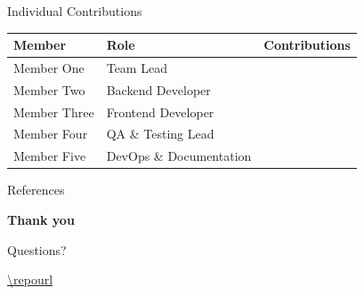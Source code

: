 \documentclass[aspectratio=169,11pt]{beamer}
\begin{document}
\ifindividualproject\else
\begin{frame}{Individual Contributions}
    \centering
    \begin{tabular}{llp{}}
        \toprule
        Member & Role & Contributions \\
        \midrule
        Member One & Team Lead & \\
        Member Two & Backend Developer & \\
        Member Three & Frontend Developer & \\
        Member Four & QA \& Testing Lead & \\
        Member Five & DevOps \& Documentation & \\
        \bottomrule
    \end{tabular}

    \vspace{1em}
\end{frame}
\fi

\begin{frame}[allowframebreaks]{References}
    \printbibliography[heading=none]
\end{frame}

\begin{frame}[plain]
    \centering
    {\Large\bfseries{} Thank you\par}
    \vspace{1em}
    Questions?\par
    \vspace{1em}
    {\small\url{\repourl}}
\end{frame}
\end{document}
